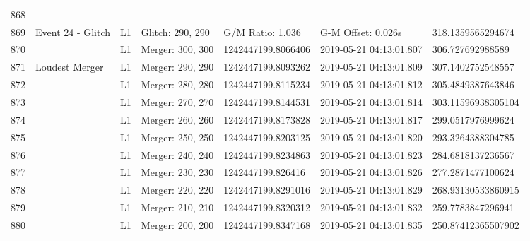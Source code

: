 \begin{longtable}{lllllll}
868  &                                                    &          &                   &                     &                          &                     \\
869  &                                  Event 24 - Glitch &       L1 &  Glitch: 290, 290 &    G/M Ratio: 1.036 &       G-M Offset: 0.026s &   318.1359565294674 \\
870  &                                                    &       L1 &  Merger: 300, 300 &  1242447199.8066406 &  2019-05-21 04:13:01.807 &    306.727692988589 \\
871  &                                     Loudest Merger &       L1 &  Merger: 290, 290 &  1242447199.8093262 &  2019-05-21 04:13:01.809 &   307.1402752548557 \\
872  &                                                    &       L1 &  Merger: 280, 280 &  1242447199.8115234 &  2019-05-21 04:13:01.812 &   305.4849387643846 \\
873  &                                                    &       L1 &  Merger: 270, 270 &  1242447199.8144531 &  2019-05-21 04:13:01.814 &  303.11596938305104 \\
874  &                                                    &       L1 &  Merger: 260, 260 &  1242447199.8173828 &  2019-05-21 04:13:01.817 &   299.0517976999624 \\
875  &                                                    &       L1 &  Merger: 250, 250 &  1242447199.8203125 &  2019-05-21 04:13:01.820 &   293.3264388304785 \\
876  &                                                    &       L1 &  Merger: 240, 240 &  1242447199.8234863 &  2019-05-21 04:13:01.823 &   284.6818137236567 \\
877  &                                                    &       L1 &  Merger: 230, 230 &   1242447199.826416 &  2019-05-21 04:13:01.826 &   277.2871477100624 \\
878  &                                                    &       L1 &  Merger: 220, 220 &  1242447199.8291016 &  2019-05-21 04:13:01.829 &  268.93130533860915 \\
879  &                                                    &       L1 &  Merger: 210, 210 &  1242447199.8320312 &  2019-05-21 04:13:01.832 &   259.7783847296941 \\
880  &                                                    &       L1 &  Merger: 200, 200 &  1242447199.8347168 &  2019-05-21 04:13:01.835 &  250.87412365507902 \\

\end{longtable}
